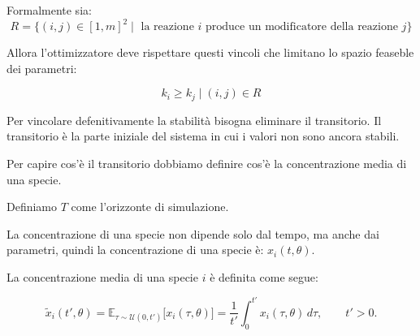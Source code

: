 Formalmente sia: 
\[
    R = \{(i,j) \in [1,m]^2 \mid \text{ la reazione } i \text{ produce un modificatore della reazione } j\}
\]

Allora l'ottimizzatore deve rispettare questi vincoli che limitano lo spazio feaseble dei parametri:

\begin{equation}
    k_i \geq  k_j \mid (i,j) \in R
\end{equation}

Per vincolare defenitivamente la stabilità bisogna eliminare il transitorio. Il transitorio è la parte
iniziale del sistema in cui i valori non sono ancora stabili.

Per capire cos'è il transitorio dobbiamo definire cos'è la concentrazione media di una specie.

Definiamo $T$ come l'orizzonte di simulazione.

La concentrazione di una specie non dipende solo dal tempo, ma anche dai parametri, quindi la concentrazione di una specie è: $x_i(t,\theta)$.

La concentrazione media di una specie $i$ è definita come segue:

\begin{equation}
    \tilde{x}_i(t',\theta)
    = \mathbb{E}_{\tau\sim\mathcal{U}(0,t')} \big[ x_i(\tau,\theta) \big]
    = \frac{1}{t'} \int_{0}^{t'} x_i(\tau,\theta)\,d\tau,\qquad t'>0.
\end{equation}

